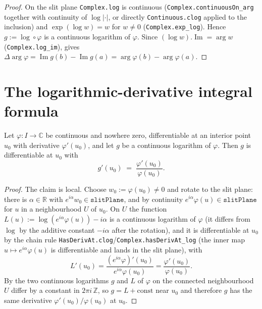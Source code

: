 \begin{proof}
\leanok
{}
On the slit plane \texttt{Complex.log} is continuous
(\texttt{Complex.continuousOn\_arg} together with continuity of
$\log|\cdot|$, or directly \texttt{Continuous.clog} applied to the inclusion) and
$\exp(\log w)=w$ for $w\neq0$ (\texttt{Complex.exp\_log}). Hence
$g:=\log\circ\varphi$ is a continuous logarithm of $\varphi$. Since
$(\log w).\operatorname{Im}=\arg w$ (\texttt{Complex.log\_im}),
 gives
$\Delta\arg\varphi = \operatorname{Im} g(b)-\operatorname{Im} g(a)
= \arg\varphi(b)-\arg\varphi(a)$.
\end{proof}

\section{The logarithmic-derivative integral formula}
\label{sec:av_logderiv}

\begin{lemma}
\label{lem:av_hasDerivAt}
\leanok
{}
Let $\varphi:I\to\mathbb{C}$ be continuous and nowhere zero, differentiable at an
interior point $u_0$ with derivative $\varphi'(u_0)$, and let $g$ be a continuous
logarithm of $\varphi$. Then $g$ is differentiable at $u_0$ with
\[
  g'(u_0) \;=\; \frac{\varphi'(u_0)}{\varphi(u_0)} .
\]
\end{lemma}

\begin{proof}
\leanok
{}
The claim is local. Choose $w_0:=\varphi(u_0)\neq0$ and rotate to the slit plane:
there is $\alpha\in\mathbb{R}$ with $e^{i\alpha}w_0\in\texttt{slitPlane}$, and by
continuity $e^{i\alpha}\varphi(u)\in\texttt{slitPlane}$ for $u$ in a neighbourhood
$U$ of $u_0$. On $U$ the function $L(u):=\log(e^{i\alpha}\varphi(u)) - i\alpha$ is a
continuous logarithm of $\varphi$ (it differs from $\log$ by the additive constant
$-i\alpha$ after the rotation), and it is differentiable at $u_0$ by the chain rule
\texttt{HasDerivAt.clog}/\texttt{Complex.hasDerivAt\_log} (the inner map
$u\mapsto e^{i\alpha}\varphi(u)$ is differentiable and lands in the slit plane),
with
\[
  L'(u_0) = \frac{(e^{i\alpha}\varphi)'(u_0)}{e^{i\alpha}\varphi(u_0)}
          = \frac{\varphi'(u_0)}{\varphi(u_0)} .
\]
By  the two continuous logarithms $g$ and $L$ of $\varphi$ on
the connected neighbourhood $U$ differ by a constant in $2\pi i\,\mathbb{Z}$, so
$g=L+\text{const}$ near $u_0$ and therefore $g$ has the same derivative
$\varphi'(u_0)/\varphi(u_0)$ at $u_0$.
\end{proof}

